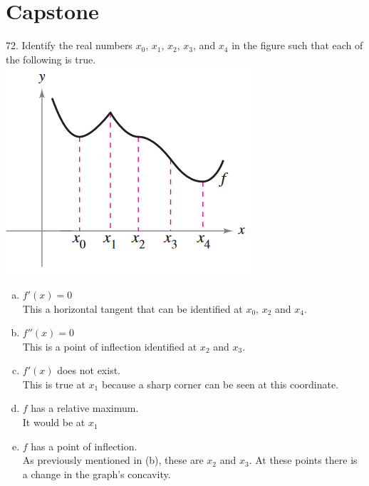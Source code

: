 \documentclass[11pt]{article}
\begin{document}
\section{Capstone}
72. Identify the real numbers $x_0$, $x_1$, $x_2$, $x_3$, and $x_4$ in the figure such that each of the following is true.\\
\includegraphics{72.png}
\begin{enumerate}[(a)]
    \item $f'(x)=0$\\
        This a horizontal tangent that can be identified at $x_0$, $x_2$ and $x_4$.
    \item $f''(x)=0$\\
        This is a point of inflection identified at $x_2$ and $x_3$.
    \item $f'(x)$ does not exist.\\
        This is true at $x_1$ because a sharp corner can be seen at this coordinate.
    \item $f$ has a relative maximum.\\
        It would be at $x_1$
    \item $f$ has a point of inflection.\\
        As previously mentioned in (b), these are $x_2$ and $x_3$. At these points there is a change in the graph's concavity.
\end{enumerate}
\end{document}
